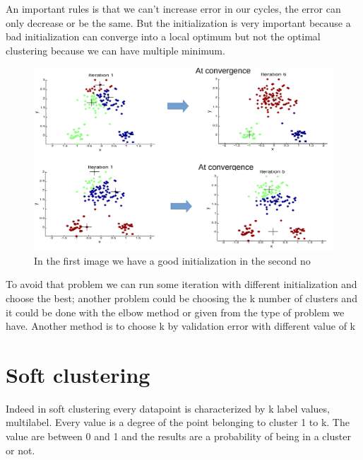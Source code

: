 An important rules is that we can't increase error in our cycles, the error can only decrease or be the same. But the initialization is very important because a bad initialization can converge into a local optimum but not the optimal clustering because we can have multiple minimum.

\begin{figure}[H]
    \centering
    \includegraphics[scale=0.3]{images/CL/CL3.png}
    \caption{In the first image we have a good initialization in the second no}
    \label{fig:enter-label}
\end{figure}

To avoid that problem we can run some iteration with different initialization and choose the best; another problem could be choosing the k number of clusters and it could be done with the elbow method or given from the type of problem we have. Another method is to choose k by validation error with different value of k


\section{Soft clustering}
Indeed in soft clustering every datapoint is characterized by k label values, multilabel. Every value is a degree of the point belonging to cluster 1 to k. The value are between 0 and 1 and the results are a probability of being in a cluster or not.

